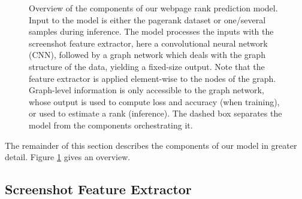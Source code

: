 \begin{figure}
    \centering

    \caption[Webpage rank prediction model architecture overview]{Overview of the components of our webpage rank prediction model. Input to the model is either the pagerank dataset or one/several samples during inference. The model processes the inputs with the screenshot feature extractor, here a convolutional neural network (CNN), followed by a graph network which deals with the graph structure of the data, yielding a fixed-size output. Note that the feature extractor is applied element-wise to the nodes of the graph. Graph-level information is only accessible to the graph network, whose output is used to compute loss and accuracy (when training), or used to estimate a rank (inference). The dashed box separates the model from the components orchestrating it.}
    \label{fig:methodcomponents}
\end{figure}

The remainder of this section describes the components of our model in greater detail. Figure \ref{fig:methodcomponents} gives an overview.

\subsection{Screenshot Feature Extractor}

